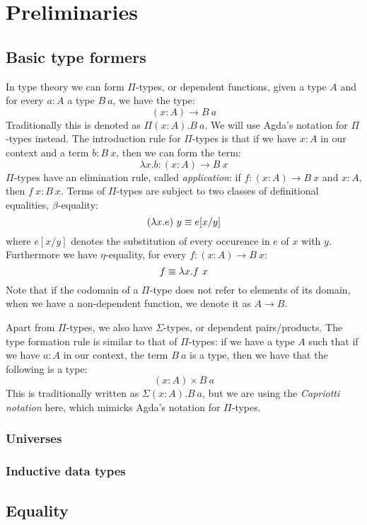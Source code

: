\chapter{Preliminaries}

\section{Basic type formers}
In type theory we can form $\Pi$-types, or dependent functions, given
a type $A$ and for every $a : A$ a type $B\ a$, we have the type:
$$
(x : A) \to B\ a
$$
Traditionally this is denoted as $\Pi (x : A) . B\ a$. We will use
Agda's notation for $\Pi$-types instead. The introduction rule for
$\Pi$-types is that if we have $x : A$ in our context and a term
$b : B\ x$, then we can form the term:
$$
\lambda x . b : (x : A) \to B\ x
$$
$\Pi$-types have an elimination rule, called \emph{application}: if
$f : (x : A) \to B\ x$ and $x : A$, then $f\ x : B\ x$. Terms of
$\Pi$-types are subject to two classes of definitional equalities,
$\beta$-equality:
$$
(\lambda x . e)\ y \equiv e[x/y]
$$
where $e[x/y]$ denotes the substitution of every occurence in $e$ of
$x$ with $y$. Furthermore we have $\eta$-equality, for every
$f : (x : A) \to B\ x$:
$$
f \equiv \lambda x . f\ x
$$
Note that if the codomain of a $\Pi$-type does not refer to elements
of its domain, \ie when we have a non-dependent function, we denote it
as $A \to B$.

Apart from $\Pi$-types, we also have $\Sigma$-types, or dependent
pairs/products. The type formation rule is similar to that of
$\Pi$-types: if we have a type $A$ such that if we have $a : A$ in our
context, the term $B\ a$ is a type, then we have that the following is a type:
$$
(x : A) \times B\ a
$$
This is traditionally written as $\Sigma (x : A) . B\ a$, but we are
using the \emph{Capriotti notation} here, which mimicks Agda's
notation for $\Pi$-types.

\subsection{Universes}



\subsection{Inductive data types}

\section{Equality}

